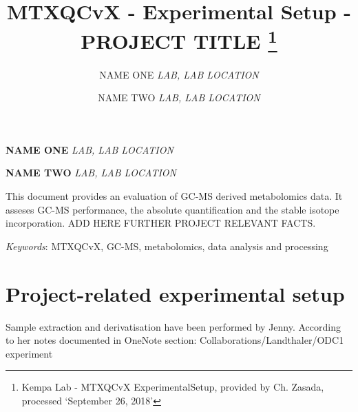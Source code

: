 \documentclass[10pt,]{article}
\title{MTXQCvX - Experimental Setup - PROJECT TITLE \thanks{Kempa Lab - MTXQCvX ExperimentalSetup, provided by Ch. Zasada, processed
`September 26, 2018'}  }
\author{\Large NAME ONE\vspace{0.05in} \newline\normalsize\emph{LAB, LAB LOCATION}   \and \Large NAME TWO\vspace{0.05in} \newline\normalsize\emph{LAB, LAB LOCATION}  }
\date{}
\newcommand*{\authorfont}{\fontfamily{phv}\selectfont}
\renewenvironment{abstract}
 {{%
    \setlength{\leftmargin}{0mm}
    \setlength{\rightmargin}{\leftmargin}%
  }%
  \relax}
 {\endlist}
\begin{document}
	
%

{%
\setlength{\parindent}{0pt}
\thispagestyle{plain}
{\fontsize{18}{20}\selectfont\raggedright 
\maketitle  %

}

{
   \vskip 13.5pt\relax \normalsize\fontsize{11}{12} 
\textbf{\authorfont NAME ONE} \hskip 15pt \emph{\small LAB, LAB LOCATION}   \par \textbf{\authorfont NAME TWO} \hskip 15pt \emph{\small LAB, LAB LOCATION}   

}

}



{
\hypersetup{linkcolor=black}
\setcounter{tocdepth}{2}
\tableofcontents
}




\begin{abstract}

    \hbox{\vrule height .2pt width 39.14pc}

    \vskip 8.5pt %

\noindent This document provides an evaluation of GC-MS derived metabolomics data.
It asseses GC-MS performance, the absolute quantification and the stable
isotope incorporation. ADD HERE FURTHER PROJECT RELEVANT FACTS.


\vskip 8.5pt \noindent \emph{Keywords}: MTXQCvX, GC-MS, metabolomics, data analysis and processing \par

    \hbox{\vrule height .2pt width 39.14pc}



\end{abstract}


\vskip 6.5pt

\noindent  \section{Project-related experimental
setup}\label{project-related-experimental-setup}

Sample extraction and derivatisation have been performed by Jenny.
According to her notes documented in OneNote section:
Collaborations/Landthaler/ODC1 experiment
\end{document}
